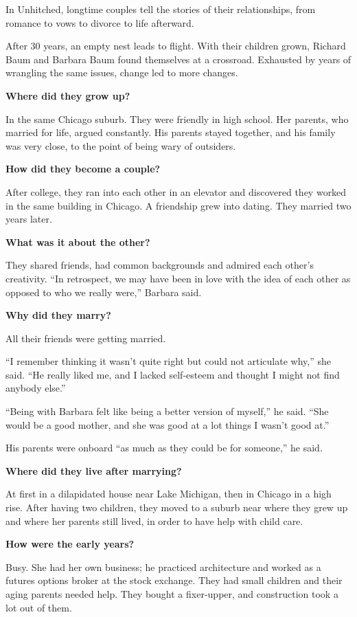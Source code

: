 In Unhitched, longtime couples tell the stories of their relationships,
from romance to vows to divorce to life afterward.

After 30 years, an empty nest leads to flight. With their children
grown, Richard Baum and Barbara Baum found themselves at a crossroad.
Exhausted by years of wrangling the same issues, change led to more
changes.

\textbf{Where did they grow up?}

In the same Chicago suburb. They were friendly in high school. Her
parents, who married for life, argued constantly. His parents stayed
together, and his family was very close, to the point of being wary of
outsiders.

\textbf{How did they become a couple?}

After college, they ran into each other in an elevator and discovered
they worked in the same building in Chicago. A friendship grew into
dating. They married two years later.

\textbf{What was it about the other?}

They shared friends, had common backgrounds and admired each other's
creativity. ``In retrospect, we may have been in love with the idea of
each other as opposed to who we really were,'' Barbara said.

\textbf{Why did they marry?}

All their friends were getting married.

``I remember thinking it wasn't quite right but could not articulate
why,'' she said. ``He really liked me, and I lacked self-esteem and
thought I might not find anybody else.''

``Being with Barbara felt like being a better version of myself,'' he
said. ``She would be a good mother, and she was good at a lot things I
wasn't good at.''

His parents were onboard ``as much as they could be for someone,'' he
said.

\textbf{Where did they live after marrying?}

At first in a dilapidated house near Lake Michigan, then in Chicago in a
high rise. After having two children, they moved to a suburb near where
they grew up and where her parents still lived, in order to have help
with child care.

\textbf{How were the early years?}

Busy. She had her own business; he practiced architecture and worked as
a futures options broker at the stock exchange. They had small children
and their aging parents needed help. They bought a fixer-upper, and
construction took a lot out of them.

